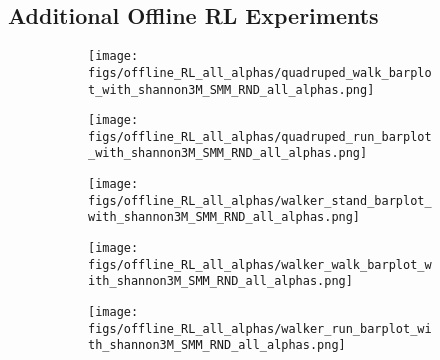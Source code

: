 \newpage
\subsection{Additional Offline RL Experiments}


\begin{figure}[htp]
    \begin{subfigure}{\textwidth}
    \texttt{[image: figs/offline\_RL\_all\_alphas/quadruped\_walk\_barplot\_with\_shannon3M\_SMM\_RND\_all\_alphas.png]}
    \label{fig:orl_appendix:quad_walk}
    \end{subfigure}
    \vspace{-4mm}
    \begin{subfigure}{\textwidth}
    \texttt{[image: figs/offline\_RL\_all\_alphas/quadruped\_run\_barplot\_with\_shannon3M\_SMM\_RND\_all\_alphas.png]}
    \label{fig:orl_appendix:quad_run}
    \end{subfigure}
    \vspace{-4mm}
    \begin{subfigure}{\textwidth}
    \texttt{[image: figs/offline\_RL\_all\_alphas/walker\_stand\_barplot\_with\_shannon3M\_SMM\_RND\_all\_alphas.png]}
    \label{fig:orl_appendix:walker_stand}
    \end{subfigure}
    \vspace{-4mm}
    \begin{subfigure}{\textwidth}
    \texttt{[image: figs/offline\_RL\_all\_alphas/walker\_walk\_barplot\_with\_shannon3M\_SMM\_RND\_all\_alphas.png]}
    \label{fig:orl_appendix:walker_walk}
    \end{subfigure}
    \vspace{-4mm}
    \begin{subfigure}{\textwidth}
    \texttt{[image: figs/offline\_RL\_all\_alphas/walker\_run\_barplot\_with\_shannon3M\_SMM\_RND\_all\_alphas.png]}
    \label{fig:orl_appendix:walker_run}
    \end{subfigure}
    \vspace{-4mm}
    \caption{  }
    \label{fig:orl_appendix}
\end{figure}



